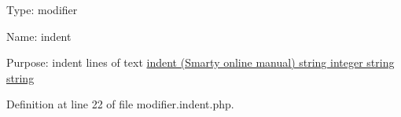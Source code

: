 \-Type\-: modifier\par
 \-Name\-: indent\par
 \-Purpose\-: indent lines of text \hyperlink{}{indent (\-Smarty online manual)  string  integer  string  string }

\-Definition at line 22 of file modifier.\-indent.\-php.


